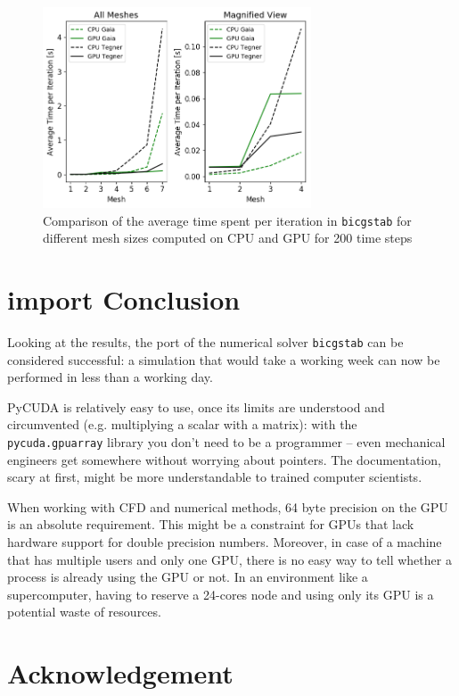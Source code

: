 \documentclass[11pt]{article}
\begin{document}
\begin{figure}[H]
    \centering
    \includegraphics[width=0.71\textwidth]{Comparison_time_per_iteration.png}
    \caption{Comparison of the average time spent per iteration in \texttt{bicgstab} for different mesh sizes computed on CPU and GPU for 200 time steps}
    \label{final_time_per_iteration}
\end{figure}

\section{import Conclusion}

Looking at the results, the port of the numerical solver \texttt{bicgstab} can be considered successful: a simulation that would take a working week can now be performed in less than a working day.

PyCUDA is relatively easy to use, once its limits are understood and circumvented (e.g. multiplying a scalar with a matrix): with the \texttt{pycuda.gpuarray} library you don't need to be a programmer -- even mechanical engineers get somewhere without worrying about pointers. The documentation, scary at first, might be more understandable to trained computer scientists.

When working with CFD and numerical methods, 64 byte precision on the GPU is an absolute requirement. This might be a constraint for GPUs that lack hardware support for double precision numbers. Moreover, in case of a machine that has multiple users and only one GPU, there is no easy way to tell whether a process is already using the GPU or not. In an environment like a supercomputer, having to reserve a 24-cores node and using only its GPU is a potential waste of resources.

\section*{Acknowledgement}
\end{document}
